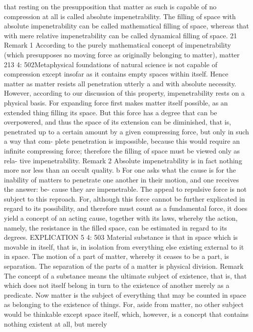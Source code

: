 that resting on the presupposition that matter as such is capable of no
compression at all is called absolute impenetrability. The ﬁlling of space
with absolute impenetrability can be called mathematical ﬁlling of space,
whereas that with mere relative impenetrability can be called dynamical
ﬁlling of space. 21
Remark 1
According to the purely mathematical concept of impenetrability (which
presupposes no moving force as originally belonging to matter), matter
213
4: 502Metaphysical foundations of natural science
is not capable of compression except insofar as it contains empty spaces
within itself. Hence matter as matter resists all penetration utterly a and
with absolute necessity. However, according to our discussion of this
property, impenetrability rests on a physical basis. For expanding force
ﬁrst makes matter itself possible, as an extended thing ﬁlling its space.
But this force has a degree that can be overpowered, and thus the space
of its extension can be diminished, that is, penetrated up to a certain
amount by a given compressing force, but only in such a way that com-
plete penetration is impossible, because this would require an inﬁnite
compressing force; therefore the ﬁlling of space must be viewed only as rela-
tive impenetrability.
Remark 2
Absolute impenetrability is in fact nothing more nor less than an occult
quality. b For one asks what the cause is for the inability of matters to
penetrate one another in their motion, and one receives the answer: be-
cause they are impenetrable. The appeal to repulsive force is not subject
to this reproach. For, although this force cannot be further explicated in
regard to its possibility, and therefore must count as a fundamental force,
it does yield a concept of an acting cause, together with its laws, whereby
the action, namely, the resistance in the ﬁlled space, can be estimated in
regard to its degrees.
EXPLICATION 5
4: 503
Material substance is that in space which is movable in itself, that is, in
isolation from everything else existing external to it in space. The motion
of a part of matter, whereby it ceases to be a part, is separation. The
separation of the parts of a matter is physical division.
Remark
The concept of a substance means the ultimate subject of existence, that
is, that which does not itself belong in turn to the existence of another
merely as a predicate. Now matter is the subject of everything that may be
counted in space as belonging to the existence of things. For, aside from
matter, no other subject would be thinkable except space itself, which,
however, is a concept that contains nothing existent at all, but merely
